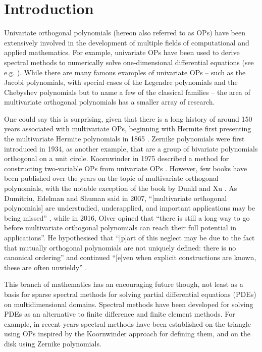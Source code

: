 
\chapter{Introduction}\label{CHAPTER:intro}

Univariate orthogonal polynomials (hereon also referred to as OPs) have been extensively involved in the development of multiple fields of computational and applied mathematics. For example, univariate OPs have been used to derive spectral methods to numerically solve one-dimensional differential equations (see e.g. \cite{trefethen2000spectral, canuto2007spectral, gottlieb1977numerical, boyd2001chebyshev, mason2002chebyshev, shen2011spectral, olver2013fast}). While there are many famous examples of univariate OPs -- such as the Jacobi polynomials, with special cases of the Legendre polynomials and the Chebyshev polynomials but to name a few of the classical families \cite[\S18.3]{DLMF} -- the area of multivariate orthogonal polynomials has a smaller array of research. 

One could say this is surprising, given that there is a long history of around 150 years associated with multivariate OPs, beginning with Hermite first presenting the multivariate Hermite polynomials in 1865 \cite{appel1926fonctions, ismail2017review}. Zernike polynomials \cite{zernike1934diffraction} were first introduced in 1934, as another example, that are a group of bivariate polynomials orthogonal on a unit circle. Koornwinder in 1975 described a method for constructing two-variable OPs from univariate OPs \cite{koornwinder1975two}. However, few books have been published over the years on the topic of multivariate orthogonal polynomials, with the notable exception of the book by Dunkl and Xu \cite{dunkl2014orthogonal}. As Dumitriu, Edelman and Shuman said in 2007, \enquote{[multivariate orthogonal polynomials] are understudied, underapplied, and important applications may be being missed} \cite{dumitriu2007mops}, while in 2016, Olver opined that \enquote{there is still a long way to go before multivariate orthogonal polynomials can reach their full potential in applications}. He hypothesised that \enquote{[p]art of this neglect may be due to the fact that mutually orthogonal polynomials are not uniquely defined: there is no canonical ordering} and continued \enquote{[e]ven when explicit constructions are known, these are often unwieldy} \cite{olver2016review}.

This branch of mathematics has an encouraging future though, not least as a basis for sparse spectral methods for solving partial differential equations (PDEs) on multidimensional domains. Spectral methods have been developed for solving PDEs as an alternative to finite difference and finite element methods. For example, in recent years spectral methods have been established on the triangle \cite{olver2019triangle} using OPs inspired by the Koornwinder approach for defining them, and on the disk \cite{vasil2016tensor} using Zernike polynomials.

